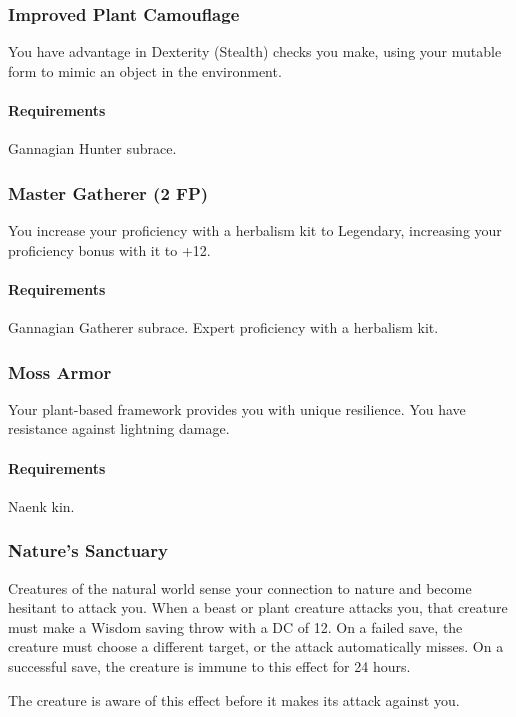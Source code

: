     \subsubsection{Improved Plant Camouflage} \label{feat::improvedplantcamouflage}
        You have advantage in Dexterity (Stealth) checks you make, using your mutable form to mimic an object in the environment.
        \paragraph{Requirements} Gannagian Hunter subrace.
    \subsubsection{Master Gatherer (2 FP)} \label{feat::mastergatherer}
        You increase your proficiency with a herbalism kit to Legendary, increasing your proficiency bonus with it to +12.
        \paragraph{Requirements} Gannagian Gatherer subrace. Expert proficiency with a herbalism kit.
    \subsubsection{Moss Armor} \label{feat::mossarmor}
        Your plant-based framework provides you with unique resilience.
        You have resistance against lightning damage.
        \paragraph{Requirements} Naenk kin.
    \subsubsection{Nature's Sanctuary} \label{feat::naturessanctuary}
        Creatures of the natural world sense your connection to nature and become hesitant to attack you.
        When a beast or plant creature attacks you, that creature must make a Wisdom saving throw with a DC of 12.
        On a failed save, the creature must choose a different target, or the attack automatically misses.
        On a successful save, the creature is immune to this effect for 24 hours.

        The creature is aware of this effect before it makes its attack against you.
